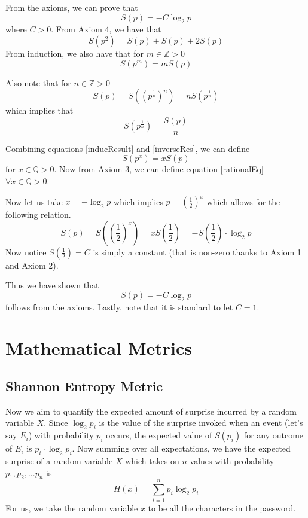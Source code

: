\documentclass{article}
\begin{document}
\bigskip

From the axioms, we can prove that
\[
S(p) = -C\log_2 p
\]
where $C > 0$.
From Axiom 4, we have that 
\[
S(p^2)=S(p)+S(p)+2S(p)
\]
From induction, we also have that for $m\in \mathbb{Z} > 0$
\begin{equation} \label{inducResult}
    S(p^m)=mS(p)
\end{equation}

Also note that for $n\in \mathbb{Z} > 0$
\[
S(p) = S\left((p^\frac{1}{n})^n\right) = nS(p^\frac{1}{n})
\]
which implies that
\begin{equation} \label{inverseRes}
    S(p^\frac{1}{n}) = \frac{S(p)}{n}
\end{equation}

Combining equations \ref{inducResult} and \ref{inverseRes}, we can define
\begin{equation} \label{rationalEq}
    S(p^x)=xS(p)
\end{equation}
for $x \in \mathbb{Q} >0$. Now from Axiom 3, we can define equation \ref{rationalEq} $\forall x \in\mathbb{Q} >0$.

Now let us take $x=-\log_2 p$ which implies $p=\left(\frac{1}{2}\right)^x$ which allows for the following relation.
\[
S(p) = S\left((\frac{1}{2})^x\right) = xS\left(\frac{1}{2}\right) = -S\left(\frac{1}{2}\right)\cdot\log_2 p
\]
Now notice $S\left(\frac{1}{2}\right) = C$ is simply a constant (that is non-zero thanks to Axiom 1 and Axiom 2).

Thus we have shown that
\begin{equation}
    S(p) = -C\log_2 p
\end{equation}
follows from the axioms.
Lastly, note that it is standard to let $C=1$.


\section{Mathematical Metrics}
\subsection{Shannon Entropy Metric}
Now we aim to quantify the expected amount of surprise incurred by a random variable $X$. Since $\log_2 p_i$ is the value of the surprise invoked when an event (let's say $E_i$) with probability $p_i$ occurs, the expected value of $S(p_i)$ for any outcome of $E_i$ is $p_i \cdot \log_2p_i$.
Now summing over all expectations, we have the expected surprise of a random variable $X$ which takes on $n$ values with probability $p_1,p_2,...p_n$ is
\[
H(x) = \sum_{i=1}^n p_i\log_2p_i
\]
For us, we take the random variable $x$ to be all the characters in the password.
\end{document}
